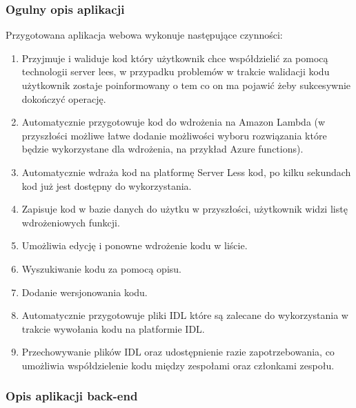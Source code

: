 \documentclass[runningheads,12pt]{llncs}
\begin{document}
\subsubsection{Ogulny opis aplikacji}

Przygotowana aplikacja webowa wykonuje następujące czynności:

\begin{enumerate}
    \item Przyjmuje i waliduje kod który użytkownik chce współdzielić za pomocą technologii server lees, w przypadku problemów w trakcie walidacji kodu użytkownik zostaje poinformowany o tem co on ma pojawić żeby sukcesywnie dokończyć operację.
    \item Automatycznie przygotowuje kod do wdrożenia na Amazon Lambda (w przyszłości możliwe łatwe dodanie możliwości wyboru rozwiązania które będzie wykorzystane dla wdrożenia, na przykład Azure functions).
    \item Automatycznie wdraża kod na platformę Server Less kod, po kilku sekundach kod już jest dostępny do wykorzystania.
    \item Zapisuje kod w bazie danych do użytku w przyszłości, użytkownik widzi listę wdrożeniowych funkcji.
    \item Umożliwia edycję i ponowne wdrożenie kodu w liście.
    \item Wyszukiwanie kodu za pomocą opisu.
    \item Dodanie wersjonowania kodu.
    \item Automatycznie  przygotowuje pliki IDL które są zalecane do wykorzystania  w trakcie wywołania kodu na platformie IDL.
    \item Przechowywanie plików IDL oraz udostępnienie razie zapotrzebowania, co umożliwia współdzielenie kodu między zespołami oraz członkami zespołu.
\end{enumerate}

\subsubsection{Opis aplikacji back-end}
\end{document}
